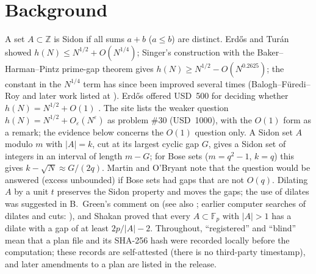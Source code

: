\documentclass[11pt]{article}
\begin{document}
\begin{abstract}
$\binom k3P_3+\binom k4P_4$, where $P_3,P_4$ are the window probabilities of 3-term progressions and parallelograms ($k=3,\dots,6$ at $C=2$ on 129 primes; $k=7$ at $C=2$
and $k=3,\dots,8$ at $C=4$ on 64 of them); and $\sum_\rho(N(\rho)-E)^2$ is close to the order of the multiplier group times $\sum_\rho E$ for prime $q$ and non-cube prime powers,
while most of the excess at cube $q$ is explained by (iv).
\emph{What remains:} a negative answer would follow from Poisson convergence of all fixed-order factorial moments. For order $3$ this reduces to a variance bound, which by (iii) and (v)
is a statement about the average of $P(\lambda)$ over all $\lambda$; for order $\ge4$ we have no such reduction.
\end{abstract}

\section{Background}
A set $A\subset\mathbb Z$ is Sidon if all sums $a+b$ ($a\le b$) are distinct. Erd\H{o}s and Tur\'an \cite{ET} showed
$h(N)\le N^{1/2}+O(N^{1/4})$; Singer's construction \cite{Si} with the Baker--Harman--Pintz prime-gap theorem \cite{BHP} gives
$h(N)\ge N^{1/2}-O(N^{0.2625})$; the constant in the $N^{1/4}$ term has since been improved several times (Balogh--F\"uredi--Roy
\cite{BFR} and later work listed at \cite{EP}). Erd\H{o}s offered USD~500 for deciding whether
$h(N)=N^{1/2}+O(1)$ \cite{Guy,MO}. The site \cite{EP} lists the weaker question $h(N)=N^{1/2}+O_\varepsilon(N^\varepsilon)$ as
problem \#30 (USD~1000), with the $O(1)$ form as a remark; the evidence below concerns the $O(1)$ question only.
A Sidon set $A$ modulo $m$ with $|A|=k$, cut at its largest cyclic gap $G$, gives a Sidon set of integers in an interval of length
$m-G$; for Bose sets \cite{Bo} ($m=q^2-1$, $k=q$) this gives $k-\sqrt{N}\approx G/(2q)$. Martin and O'Bryant \cite{MO} note that
the question would be answered (excess unbounded) if Bose sets had gaps that are not $O(q)$. Dilating $A$ by a unit $t$ preserves
the Sidon property and moves the gaps; the use of dilates was suggested in B.~Green's comment on \cite{Go} (see also \cite{Gr}; earlier computer searches of dilates and cuts: \cite{Z,RD}), and Shakan \cite{Sh}
proved that every $A\subset\mathbb F_p$ with $|A|>1$ has a dilate with a gap of at least $2p/|A|-2$.
Throughout, ``registered'' and ``blind'' mean that a plan file and its SHA-256 hash were recorded locally before the computation; these records are self-attested (there is no third-party timestamp), and later amendments to a plan are listed in the release.
\end{document}

